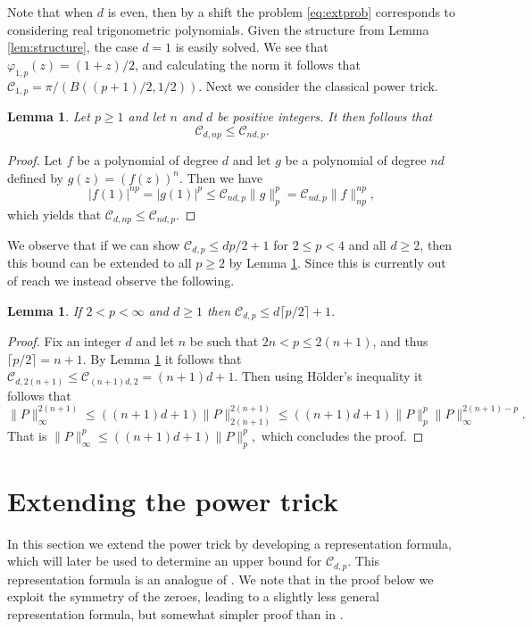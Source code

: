 \documentclass{amsart}
\theoremstyle{plain}
\newtheorem{lemma}[theorem]{Lemma}
\theoremstyle{remark}
\begin{document}
	Note that when $d$ is even, then by a shift the problem \eqref{eq:extprob} corresponds to considering real trigonometric polynomials. Given the structure from Lemma \ref{lem:structure}, the case $d=1$ is easily solved. We see that $\varphi_{1,p}(z)=(1+z)/2$, and calculating the norm it follows that $\mathscr{C}_{1,p}=\pi/(B((p+1)/2, 1/2))$. Next we consider the classical power trick.
	
	\begin{lemma}\label{lem:PowerAlt2}
		Let $p \geq 1$ and let $n$ and $d$ be positive integers. It then follows that 
		\[\mathscr{C}_{d,np} \leq \mathscr{C}_{nd,p}.\] 
	\end{lemma}
	
	\begin{proof}
		Let $f$ be a polynomial of degree $d$ and let $g$ be a polynomial of degree $nd$ defined by $g(z)=(f(z))^n$. Then we have
		\[|f(1)|^{np}=|g(1)|^p \leq \mathscr{C}_{nd,p} \|g\|^p_{p}=\mathscr{C}_{nd,p} \|f\|^{np}_{np},\]
		which yields that $\mathscr{C}_{d,np} \leq \mathscr{C}_{nd,p}$.
	\end{proof}
	We observe that if we can show $\mathscr{C}_{d,p} \leq dp/2+1$ for $2 \leq p <4$ and all $d \geq 2$, then this bound can be extended to all $p \geq 2$ by Lemma \ref{lem:PowerAlt2}. Since this is currently out of reach we instead observe the following. 
	\begin{lemma}\label{lem:upper_power}
		If $2<p<\infty$ and $d \geq 1$ then $\mathscr{C}_{d,p} \leq d\lceil p/2\rceil+1$.
	\end{lemma}
	
	\begin{proof}
		Fix an integer $d$ and let $n$ be such that $2n<p \leq 2(n+1)$, and thus $\lceil p/2 \rceil=n+1$. By Lemma \ref{lem:PowerAlt2} it follows that $\mathscr{C}_{d,2(n+1)} \leq \mathscr{C}_{(n+1)d, 2} = (n+1)d+1$. Then using Hölder's inequality it follows that 
		\[\|P\|_\infty^{2(n+1)} \leq ((n+1)d+1)\|P\|_{2(n+1)}^{2(n+1)} \leq  ((n+1)d+1)\|P\|_{p}^{p} \|P\|_\infty^{2(n+1)-p}.\]
		That is $\|P\|_\infty^{p} \leq ((n+1)d+1)\|P\|_{p}^{p},$ which concludes the proof.
	\end{proof}
	
	\section{Extending the power trick}\label{sec:Genpower}
	In this section we extend the power trick by developing a representation formula, which will later be used to determine an upper bound for $\mathscr{C}_{d,p}$. This  representation formula is an analogue of \cite[Theorem 2.4]{Brevig}. We note that in the proof below we exploit the symmetry of the zeroes, leading to a slightly less general representation formula, but somewhat simpler proof than in \cite[Theorem 2.4]{Brevig}.
	
\end{document}
